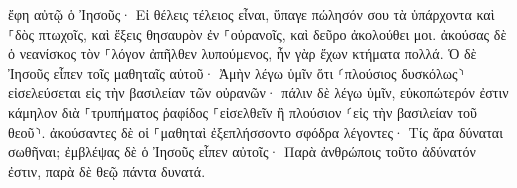 \documentclass{openreader}
\begin{document}
ἔφη αὐτῷ ὁ Ἰησοῦς· Εἰ θέλεις τέλειος εἶναι, ὕπαγε πώλησόν σου τὰ ὑπάρχοντα καὶ ⸀δὸς πτωχοῖς, καὶ ἕξεις θησαυρὸν ἐν ⸀οὐρανοῖς, καὶ δεῦρο ἀκολούθει μοι. 
ἀκούσας δὲ ὁ νεανίσκος τὸν ⸀λόγον ἀπῆλθεν λυπούμενος, ἦν γὰρ ἔχων κτήματα πολλά. 
Ὁ δὲ Ἰησοῦς εἶπεν τοῖς μαθηταῖς αὐτοῦ· Ἀμὴν λέγω ὑμῖν ὅτι ⸂πλούσιος δυσκόλως⸃ εἰσελεύσεται εἰς τὴν βασιλείαν τῶν οὐρανῶν· 
πάλιν δὲ λέγω ὑμῖν, εὐκοπώτερόν ἐστιν κάμηλον διὰ ⸀τρυπήματος ῥαφίδος ⸀εἰσελθεῖν ἢ πλούσιον ⸂εἰς τὴν βασιλείαν τοῦ θεοῦ⸃. 
ἀκούσαντες δὲ οἱ ⸀μαθηταὶ ἐξεπλήσσοντο σφόδρα λέγοντες· Τίς ἄρα δύναται σωθῆναι; 
ἐμβλέψας δὲ ὁ Ἰησοῦς εἶπεν αὐτοῖς· Παρὰ ἀνθρώποις τοῦτο ἀδύνατόν ἐστιν, παρὰ δὲ θεῷ πάντα δυνατά. 
\end{document}

